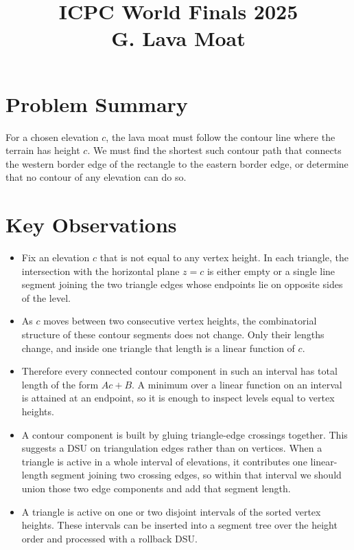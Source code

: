 \documentclass[11pt]{article}
\title{ICPC World Finals 2025\\G. Lava Moat}
\author{}
\date{}
\begin{document}
\maketitle

\section*{Problem Summary}

For a chosen elevation $c$, the lava moat must follow the contour line where the terrain has height $c$.
We must find the shortest such contour path that connects the western border edge of the rectangle to the
eastern border edge, or determine that no contour of any elevation can do so.

\section*{Key Observations}

\begin{itemize}[leftmargin=*]
    \item Fix an elevation $c$ that is not equal to any vertex height.
    In each triangle, the intersection with the horizontal plane $z=c$ is either empty or a single line
    segment joining the two triangle edges whose endpoints lie on opposite sides of the level.
    \item As $c$ moves between two consecutive vertex heights, the combinatorial structure of these contour
    segments does not change. Only their lengths change, and inside one triangle that length is a linear
    function of $c$.
    \item Therefore every connected contour component in such an interval has total length of the form
    $A c + B$.
    A minimum over a linear function on an interval is attained at an endpoint, so it is enough to inspect
    levels equal to vertex heights.
    \item A contour component is built by gluing triangle-edge crossings together.
    This suggests a DSU on triangulation edges rather than on vertices.
    When a triangle is active in a whole interval of elevations, it contributes one linear-length segment
    joining two crossing edges, so within that interval we should union those two edge components and add
    that segment length.
    \item A triangle is active on one or two disjoint intervals of the sorted vertex heights.
    These intervals can be inserted into a segment tree over the height order and processed with a rollback
    DSU.
\end{itemize}
\end{document}
